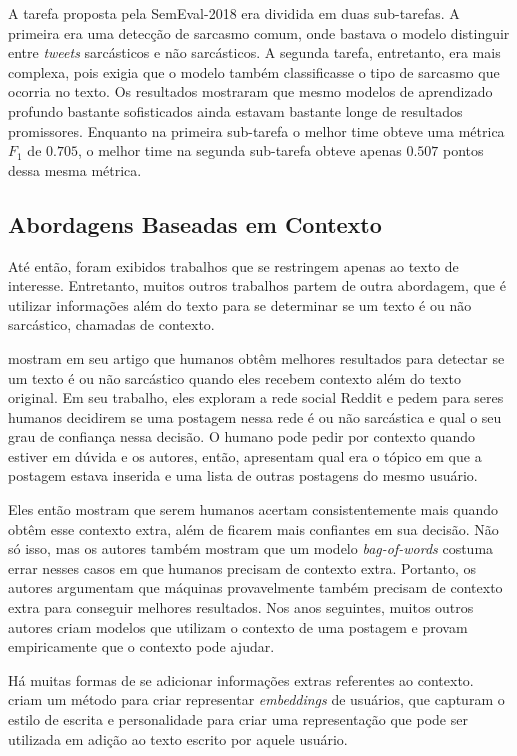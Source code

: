 A tarefa proposta pela SemEval-2018 era dividida em duas sub-tarefas. A primeira
era uma detecção de sarcasmo comum, onde bastava o modelo distinguir entre
\textit{tweets} sarcásticos e não sarcásticos. A segunda tarefa, entretanto, era
mais complexa, pois exigia que o modelo também classificasse o tipo de sarcasmo
que ocorria no texto. Os resultados mostraram que mesmo modelos de aprendizado
profundo bastante sofisticados ainda estavam bastante longe de resultados
promissores. Enquanto na primeira sub-tarefa o melhor time obteve uma métrica
$F_1$ de $0.705$, o melhor time na segunda sub-tarefa obteve apenas $0.507$
pontos dessa mesma métrica.

\subsection{Abordagens Baseadas em Contexto}%
\label{sub:abordagens_baseadas_em_contexto}

Até então, foram exibidos trabalhos que se restringem apenas ao texto de
interesse. Entretanto, muitos outros trabalhos partem de outra abordagem, que é
utilizar informações além do texto para se determinar se um texto é ou não
sarcástico, chamadas de contexto.

\cite{wallace-etal:2014:ironic-context} mostram em seu artigo que humanos obtêm
melhores resultados para detectar se um texto é ou não sarcástico quando eles
recebem contexto além do texto original. Em seu trabalho, eles exploram a rede
social Reddit e pedem para seres humanos decidirem se uma postagem nessa rede é
ou não sarcástica e qual o seu grau de confiança nessa decisão. O humano pode
pedir por contexto quando estiver em dúvida e os autores, então, apresentam qual
era o tópico em que a postagem estava inserida e uma lista de outras postagens
do mesmo usuário.

Eles então mostram que serem humanos acertam consistentemente mais quando obtêm
esse contexto extra, além de ficarem mais confiantes em sua decisão. Não só
isso, mas os autores também mostram que um modelo \textit{bag-of-words} costuma
errar nesses casos em que humanos precisam de contexto extra. Portanto, os
autores argumentam que máquinas provavelmente também precisam de contexto extra
para conseguir melhores resultados. Nos anos seguintes, muitos outros autores
criam modelos que utilizam o contexto de uma postagem e provam empiricamente que
o contexto pode ajudar.

Há muitas formas de se adicionar informações extras referentes ao contexto.
\cite{hazarika-etal:2018:cascade} criam um método para criar representar
\textit{embeddings} de usuários, que capturam o estilo de escrita e
personalidade para criar uma representação que pode ser utilizada em adição ao
texto escrito por aquele usuário.

